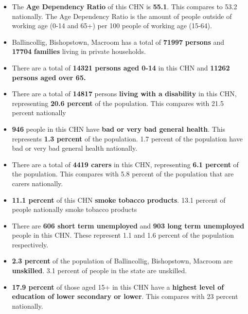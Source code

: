 \documentclass{article}
\begin{document}
\begin{itemize}

\item The \textbf{Age Dependency Ratio} of this CHN is  \textbf{55.1}. This compares to 53.2 nationally. The Age Dependency Ratio is the amount of people outside of working age (0-14 and 65+) per 100 people of working age (15-64). 

\item Ballincollig, Bishopstown, Macroom has a total of \textbf{\num{71997}} \textbf{persons} and  \textbf{\num{17704}} \textbf{families} living in private households.

\item There are a total of \textbf{\num{14321} persons aged 0-14} in this CHN and \textbf{\num{11262} persons aged over 65.} 

\item There are a total of \textbf{\num{14817}} persons \textbf{living with a disability} in this CHN, representing \textbf{20.6 percent} of the population. This compares with  21.5 percent nationally

\item \textbf{\num{946}} people in this CHN have \textbf{bad or very bad general health}. This represents \textbf{1.3 percent} of the population. 1.7 percent of the population have bad or very bad general health nationally. 

\item There are a total of \textbf{\num{4419} carers} in this CHN, representing \textbf{6.1 percent} of the population. This compares with 5.8 percent of the population that are carers nationally. 

\item \textbf{11.1 percent} of this CHN \textbf{smoke tobacco products}. 13.1 percent of people nationally smoke tobacco products

\item There are \textbf{\num{606} short term unemployed} and \textbf{\num{903} long term unemployed} people in this CHN. These represent 1.1 and 1.6 percent of the population respectively.

\item  \textbf{2.3 percent} of the population of Ballincollig, Bishopstown, Macroom are \textbf{unskilled}. 3.1 percent of people in the state are unskilled.

\item \textbf{17.9 percent} of those aged 15+ in this CHN have a \textbf{highest level of education of lower secondary or lower}. This compares with 23 percent nationally. 


\end{itemize}
\end{document}
